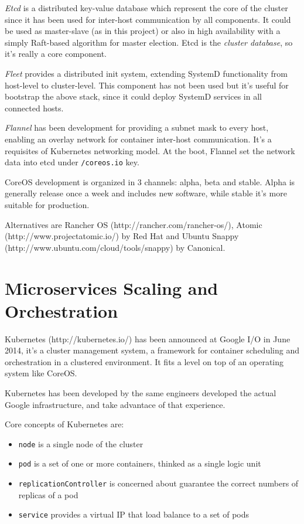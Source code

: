\emph{Etcd} is a distributed key-value database which represent the core
of the cluster since it has been used for inter-host communication by
all components. It could be used as master-slave (as in this project) or
also in high availability with a simply Raft-based algorithm for master
election. Etcd is the \emph{cluster database}, so it's really a core
component.

\emph{Fleet} provides a distributed init system, extending SystemD
functionality from host-level to cluster-level. This component has not
been used but it's useful for bootstrap the above stack, since it could
deploy SystemD services in all connected hosts.

\emph{Flannel} has been development for providing a subnet mask to every
host, enabling an overlay network for container inter-host
communication. It's a requisites of Kubernetes networking model. At the
boot, Flannel set the network data into etcd under \texttt{/coreos.io}
key.

CoreOS development is organized in 3 channels: alpha, beta and stable.
Alpha is generally release once a week and includes new software, while
stable it's more suitable for production.

Alternatives are Rancher OS (http://rancher.com/rancher-os/), Atomic
(http://www.projectatomic.io/) by Red Hat and Ubuntu Snappy
(http://www.ubuntu.com/cloud/tools/snappy) by Canonical.

\section{Microservices Scaling and
Orchestration}\label{microservices-scaling-and-orchestration}

Kubernetes (http://kubernetes.io/) has been announced at Google I/O in
June 2014, it's a cluster management system, a framework for container
scheduling and orchestration in a clustered environment. It fits a level
on top of an operating system like CoreOS.

Kubernetes has been developed by the same engineers developed the actual
Google infrastructure, and take advantace of that experience.

Core concepts of Kubernetes are:

\begin{itemize}
\itemsep1pt\parskip0pt
\item
  \texttt{node} is a single node of the cluster
\item
  \texttt{pod} is a set of one or more containers, thinked as a single
  logic unit
\item
  \texttt{replicationController} is concerned about guarantee the
  correct numbers of replicas of a pod
\item
  \texttt{service} provides a virtual IP that load balance to a set of
  pods
\end{itemize}

